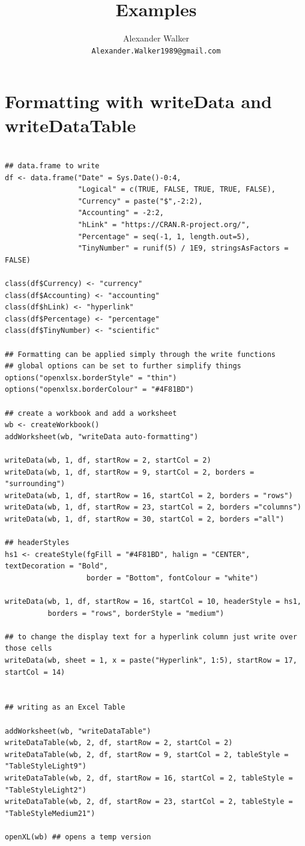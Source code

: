 \documentclass[11pt]{article}\usepackage[]{graphicx}\usepackage[]{color}
\begin{document}
\title{Examples}
\author{Alexander Walker\\
\texttt{Alexander.Walker1989@gmail.com}}
\maketitle


\section{Formatting with writeData and writeDataTable}
\begin{verbatim}

## data.frame to write
df <- data.frame("Date" = Sys.Date()-0:4,
                 "Logical" = c(TRUE, FALSE, TRUE, TRUE, FALSE),
                 "Currency" = paste("$",-2:2),
                 "Accounting" = -2:2,
                 "hLink" = "https://CRAN.R-project.org/", 
                 "Percentage" = seq(-1, 1, length.out=5),
                 "TinyNumber" = runif(5) / 1E9, stringsAsFactors = FALSE)

class(df$Currency) <- "currency"
class(df$Accounting) <- "accounting"
class(df$hLink) <- "hyperlink"
class(df$Percentage) <- "percentage"
class(df$TinyNumber) <- "scientific"

## Formatting can be applied simply through the write functions
## global options can be set to further simplify things
options("openxlsx.borderStyle" = "thin")
options("openxlsx.borderColour" = "#4F81BD")

## create a workbook and add a worksheet
wb <- createWorkbook()
addWorksheet(wb, "writeData auto-formatting")

writeData(wb, 1, df, startRow = 2, startCol = 2)
writeData(wb, 1, df, startRow = 9, startCol = 2, borders = "surrounding")
writeData(wb, 1, df, startRow = 16, startCol = 2, borders = "rows")
writeData(wb, 1, df, startRow = 23, startCol = 2, borders ="columns")
writeData(wb, 1, df, startRow = 30, startCol = 2, borders ="all")

## headerStyles
hs1 <- createStyle(fgFill = "#4F81BD", halign = "CENTER", textDecoration = "Bold",
                   border = "Bottom", fontColour = "white")

writeData(wb, 1, df, startRow = 16, startCol = 10, headerStyle = hs1,
          borders = "rows", borderStyle = "medium")

## to change the display text for a hyperlink column just write over those cells
writeData(wb, sheet = 1, x = paste("Hyperlink", 1:5), startRow = 17, startCol = 14)


## writing as an Excel Table

addWorksheet(wb, "writeDataTable")
writeDataTable(wb, 2, df, startRow = 2, startCol = 2)
writeDataTable(wb, 2, df, startRow = 9, startCol = 2, tableStyle = "TableStyleLight9")
writeDataTable(wb, 2, df, startRow = 16, startCol = 2, tableStyle = "TableStyleLight2")
writeDataTable(wb, 2, df, startRow = 23, startCol = 2, tableStyle = "TableStyleMedium21")

openXL(wb) ## opens a temp version

\end{verbatim}
\end{document}
